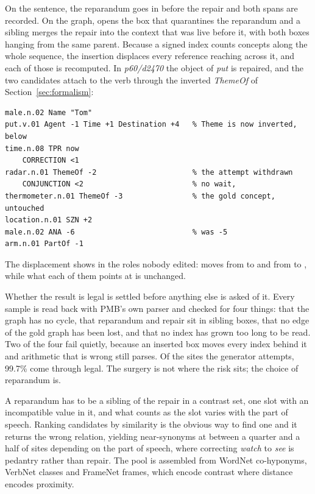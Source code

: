 \documentclass{article}
\begin{document}
On the sentence, the reparandum goes in before the repair and both spans are
recorded. On the graph,  opens the box that quarantines the
reparandum and a sibling  merges the repair into the context
that was live before it, with both boxes hanging from the same parent. Because a
signed index counts concepts along the whole sequence, the insertion displaces
every reference reaching across it, and each of those is recomputed. In
\textit{p60/d2470} the object of \textit{put} is repaired, and the two candidates
attach to the verb through the inverted \emph{ThemeOf} of
Section~\ref{sec:formalism}:

\begin{lstlisting}[style=sbn]
% gold: put.v.01 Agent -1 Time +1 Theme +2 Destination +3
male.n.02 Name "Tom"
put.v.01 Agent -1 Time +1 Destination +4   % Theme is now inverted, below
time.n.08 TPR now
    CORRECTION <1
radar.n.01 ThemeOf -2                      % the attempt withdrawn
    CONJUNCTION <2                         % no wait,
thermometer.n.01 ThemeOf -3                % the gold concept, untouched
location.n.01 SZN +2
male.n.02 ANA -6                           % was -5
arm.n.01 PartOf -1
\end{lstlisting}
The displacement shows in the roles nobody edited:  moves
from  to  and  from  to
, while what each of them points at is unchanged.

Whether the result is legal is settled before anything else is asked of it. Every
sample is read back with PMB's own parser and checked for four things: that the
graph has no cycle, that reparandum and repair sit in sibling boxes, that no edge
of the gold graph has been lost, and that no index has grown too long to be read.
Two of the four fail quietly, because an inserted box moves every index behind it
and arithmetic that is wrong still parses. Of the sites the generator attempts,
99.7\% come through legal. The surgery is not where the risk sits; the choice of
reparandum is.

A reparandum has to be a sibling of the repair in a contrast set, one slot with an
incompatible value in it, and what counts as the slot varies with the part of
speech. Ranking candidates by similarity is the obvious way to find one and it
returns the wrong relation, yielding near-synonyms at between a quarter and a
half of sites depending on the part of speech, where correcting \textit{watch}
to \textit{see} is pedantry rather than repair. The pool is assembled from WordNet co-hyponyms, VerbNet classes and
FrameNet frames, which encode contrast where distance encodes proximity.
\end{document}
